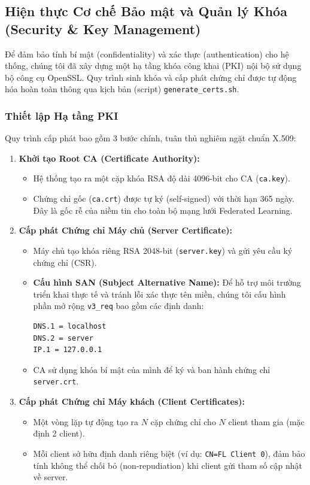 \subsection{Hiện thực Cơ chế Bảo mật và Quản lý Khóa (Security \& Key Management)}

Để đảm bảo tính bí mật (confidentiality) và xác thực (authentication) cho hệ thống, chúng tôi đã xây dựng một hạ tầng khóa công khai (PKI) nội bộ sử dụng bộ công cụ OpenSSL. Quy trình sinh khóa và cấp phát chứng chỉ được tự động hóa hoàn toàn thông qua kịch bản (script) \texttt{generate\_certs.sh}.

\subsubsection{Thiết lập Hạ tầng PKI}
Quy trình cấp phát bao gồm 3 bước chính, tuân thủ nghiêm ngặt chuẩn X.509:

\begin{enumerate}
    \item \textbf{Khởi tạo Root CA (Certificate Authority):}
    \begin{itemize}
        \item Hệ thống tạo ra một cặp khóa RSA độ dài 4096-bit cho CA (\texttt{ca.key}).
        \item Chứng chỉ gốc (\texttt{ca.crt}) được tự ký (self-signed) với thời hạn 365 ngày. Đây là gốc rễ của niềm tin cho toàn bộ mạng lưới Federated Learning.
    \end{itemize}
    
    \item \textbf{Cấp phát Chứng chỉ Máy chủ (Server Certificate):}
    \begin{itemize}
        \item Máy chủ tạo khóa riêng RSA 2048-bit (\texttt{server.key}) và gửi yêu cầu ký chứng chỉ (CSR).
        \item \textbf{Cấu hình SAN (Subject Alternative Name):} Để hỗ trợ môi trường triển khai thực tế và tránh lỗi xác thực tên miền, chúng tôi cấu hình phần mở rộng \texttt{v3\_req} bao gồm các định danh:
        \begin{verbatim}
DNS.1 = localhost
DNS.2 = server
IP.1 = 127.0.0.1
        \end{verbatim}
        \item CA sử dụng khóa bí mật của mình để ký và ban hành chứng chỉ \texttt{server.crt}.
    \end{itemize}

    \item \textbf{Cấp phát Chứng chỉ Máy khách (Client Certificates):}
    \begin{itemize}
        \item Một vòng lặp tự động tạo ra $N$ cặp chứng chỉ cho $N$ client tham gia (mặc định 2 client).
        \item Mỗi client sở hữu định danh riêng biệt (ví dụ: \texttt{CN=FL Client 0}), đảm bảo tính không thể chối bỏ (non-repudiation) khi client gửi tham số cập nhật về server.
    \end{itemize}
\end{enumerate}

